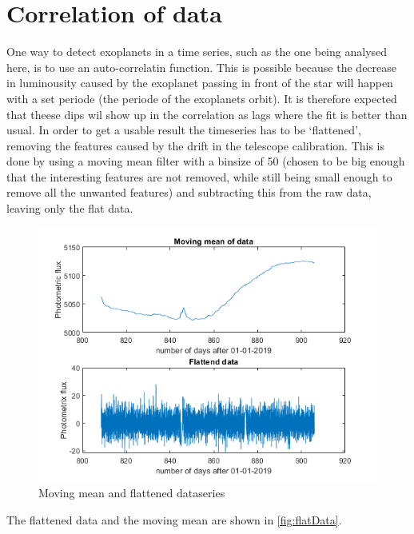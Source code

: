 \section{Correlation of data}

One way to detect exoplanets in a time series, such as the one being analysed here, is to use an auto-correlatin function. This is possible because the decrease in luminousity caused by the exoplanet passing in front of the star will happen with a set periode (the periode of the exoplanets orbit). It is therefore expected that theese dips wil show up in the correlation as lags where the fit is better than usual. In order to get a usable result the timeseries has to be `flattened', removing the features caused by the drift in the telescope calibration. This is done by using a moving mean filter with a binsize of 50 (chosen to be big enough that the interesting features are not removed, while still being small enough to remove all the unwanted features) and subtracting this from the raw data, leaving only the flat data. \\

\begin{figure}[h]
\centering
\includegraphics[width=\textwidth]{matlabstuff/flat_data.png}
\caption{Moving mean and flattened dataseries}%
\label{fig:flatData}
\end{figure}

The flattened data and the moving mean are shown in \autoref{fig:flatData}.\\

